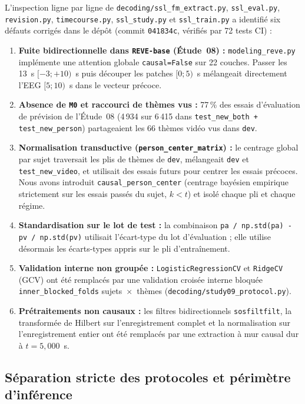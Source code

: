\documentclass[10pt]{article}
\begin{document}
L'inspection ligne par ligne de \texttt{decoding/\allowbreak ssl\_fm\_extract.py}, \texttt{ssl\_eval.py}, \texttt{revision.py}, \texttt{timecourse.py}, \texttt{ssl\_study.py} et \texttt{ssl\_train.py} a identifié six défauts corrigés dans le dépôt (commit \texttt{041834c}, vérifiés par 72 tests CI) :
\begin{enumerate}
\item \textbf{Fuite bidirectionnelle dans \texttt{REVE-base} (Étude~08) :} \texttt{modeling\_reve.py} implémente une attention globale \texttt{causal=False} sur 22 couches. Passer les 13~s $[-3 ; +10)$~s puis découper les patches $[0 ; 5)$~s mélangeait directement l'EEG $[5 ; 10)$~s dans le vecteur précoce.
\item \textbf{Absence de \texttt{M0} et raccourci de thèmes vus :} 77\,\% des essais d'évaluation de prévision de l'Étude~08 (4\,934 sur 6\,415 dans \texttt{test\_new\_both + test\_new\_person}) partageaient les 66 thèmes vidéo vus dans \texttt{dev}.
\item \textbf{Normalisation transductive (\texttt{person\_center\_matrix}) :} le centrage global par sujet traversait les plis de thèmes de \texttt{dev}, mélangeait \texttt{dev} et \texttt{test\_new\_video}, et utilisait des essais futurs pour centrer les essais précoces. Nous avons introduit \texttt{causal\_person\_center} (centrage bayésien empirique strictement sur les essais passés du sujet, $k < t$) et isolé chaque pli et chaque régime.
\item \textbf{Standardisation sur le lot de test :} la combinaison \texttt{pa / np.std(pa) - pv / np.std(pv)} utilisait l'écart-type du lot d'évaluation ; elle utilise désormais les écarts-types appris sur le pli d'entraînement.
\item \textbf{Validation interne non groupée :} \texttt{LogisticRegressionCV} et \texttt{RidgeCV} (GCV) ont été remplacés par une validation croisée interne bloquée \texttt{inner\_blocked\_folds} sujets~$\times$~thèmes (\texttt{decoding/\allowbreak study09\_protocol.py}).
\item \textbf{Prétraitements non causaux :} les filtres bidirectionnels \texttt{sosfiltfilt}, la transformée de Hilbert sur l'enregistrement complet et la normalisation sur l'enregistrement entier ont été remplacés par une extraction à mur causal dur à $t = 5{,}000$~s.
\end{enumerate}

\subsection{Séparation stricte des protocoles et périmètre d'inférence}
\end{document}
